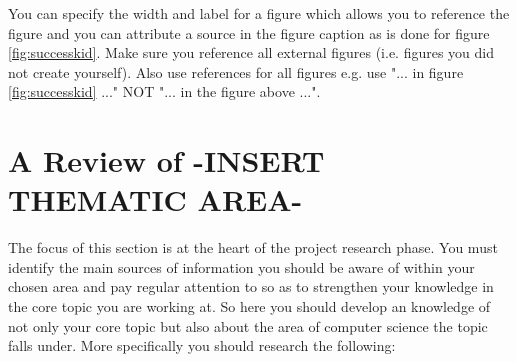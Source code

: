 You can specify the width and label for a figure which allows you to reference the figure and you can attribute a source in the figure caption as is done for figure \ref{fig:successkid}. Make sure you reference all external figures (i.e. figures you did not create yourself). Also use references for all figures e.g. use "... in figure \ref{fig:successkid} ..." NOT "... in the figure above ...".

\section{A Review of -INSERT THEMATIC AREA-}
The focus of this section is at the heart of the project research phase. You must identify the main sources of information you should be aware of within your chosen area and pay regular attention to so as to strengthen your knowledge in the core topic you are working at. So here you should develop an knowledge of not only your core topic but also about the area of computer science the topic falls under. More specifically you should research the following:
